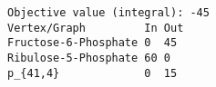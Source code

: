 \begin{verbatim}
Objective value (integral): -45
Vertex/Graph         In Out 
Fructose-6-Phosphate 0  45  
Ribulose-5-Phosphate 60 0   
p_{41,4}             0  15  
\end{verbatim}
